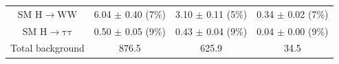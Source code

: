 \begin{table}[htb]
\begin{center}
{\begin{tabular}{c c c c }
 SM $\mathrm{H\to WW}$           &      6.04 $\pm$       0.40  (7\%)              &       3.10 $\pm$       0.11 (5\%)             &      0.34 $\pm$       0.02 (7\%)               \\
 
 SM $\mathrm{H\to\tau\tau}$                &      0.50 $\pm$       0.05 (9\%)              &       0.43 $\pm$       0.04 (9\%)             &      0.04 $\pm$       0.00 (9\%)               \\
      
\midrule
    Total background          &    876.5               &     625.9           &     34.5          \\
\bottomrule
\end{tabular}
}
\end{center}
\end{table}

